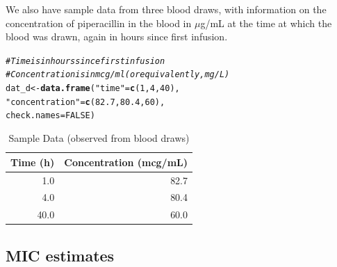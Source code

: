 \documentclass{article}\usepackage[]{graphicx}\usepackage[]{color}
\makeatletter
\newcommand{\hlnum}[1]{\textcolor[rgb]{0.686,0.059,0.569}{#1}}%
\newcommand{\hlstr}[1]{\textcolor[rgb]{0.192,0.494,0.8}{#1}}%
\newcommand{\hlcom}[1]{\textcolor[rgb]{0.678,0.584,0.686}{\textit{#1}}}%
\newcommand{\hlstd}[1]{\textcolor[rgb]{0.345,0.345,0.345}{#1}}%
\newcommand{\hlkwb}[1]{\textcolor[rgb]{0.69,0.353,0.396}{#1}}%
\newcommand{\hlkwc}[1]{\textcolor[rgb]{0.333,0.667,0.333}{#1}}%
\newcommand{\hlkwd}[1]{\textcolor[rgb]{0.737,0.353,0.396}{\textbf{#1}}}%
\newenvironment{kframe}{%
 \def\at@end@of@kframe{}%
 \ifinner\ifhmode%
  \def\at@end@of@kframe{\end{minipage}}%
  \begin{minipage}{\columnwidth}%
 \fi\fi%
 \def\FrameCommand##1{\hskip\@totalleftmargin \hskip-\fboxsep
 \colorbox{shadecolor}{##1}\hskip-\fboxsep
     \hskip-\linewidth \hskip-\@totalleftmargin \hskip\columnwidth}%
 \MakeFramed {\advance\hsize-\width
   \@totalleftmargin\z@ \linewidth\hsize
   \@setminipage}}%
 {\par\unskip\endMakeFramed%
 \at@end@of@kframe}
\newenvironment{knitrout}{}{} %
\makeatother
\begin{document}
We also have sample data from three blood draws, with information on the concentration of piperacillin in the blood in $\mu$g/mL at the time at which the blood was drawn, again in hours since first infusion.
\begin{knitrout}
\color{fgcolor}\begin{kframe}
\begin{alltt}
\hlcom{# Time is in hours since first infusion}
\hlcom{# Concentration is in mcg/ml (or equivalently, mg/L)}
\hlstd{dat_d} \hlkwb{<-} \hlkwd{data.frame}\hlstd{(}\hlstr{"time"} \hlstd{=} \hlkwd{c}\hlstd{(}\hlnum{1}\hlstd{,} \hlnum{4}\hlstd{,} \hlnum{40}\hlstd{),}
                    \hlstr{"concentration"} \hlstd{=} \hlkwd{c}\hlstd{(}\hlnum{82.7}\hlstd{,} \hlnum{80.4}\hlstd{,} \hlnum{60}\hlstd{),}
                    \hlkwc{check.names} \hlstd{=} \hlnum{FALSE}\hlstd{)}
\end{alltt}
\end{kframe}
\end{knitrout}

\begin{table}[ht]
\centering
\caption{Sample Data (observed from blood draws)} 
\begin{tabular}{rr}
  \hline
Time (h) & Concentration (mcg/mL) \\ 
  \hline
1.0 & 82.7 \\ 
  4.0 & 80.4 \\ 
  40.0 & 60.0 \\ 
   \hline
\end{tabular}
\end{table}



\subsection{MIC estimates}
\end{document}
